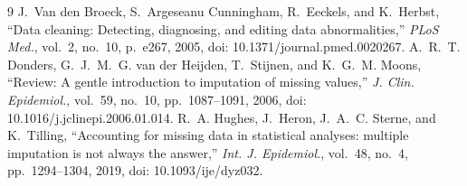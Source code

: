 \documentclass[12pt,a4paper]{article}
\begin{document}
\setcounter{section}{2}


\begin{thebibliography}{9}
   J.~Van den Broeck, S.~Argeseanu Cunningham, R.~Eeckels, and
    K.~Herbst, ``Data cleaning: Detecting, diagnosing, and editing data abnormalities,''
    \emph{PLoS Med.}, vol.~2, no.~10, p.~e267, 2005, doi: 10.1371/journal.pmed.0020267.
   A.~R.~T. Donders, G.~J.~M.~G. van der Heijden, T.~Stijnen, and
    K.~G.~M. Moons, ``Review: A gentle introduction to imputation of missing values,''
    \emph{J. Clin. Epidemiol.}, vol.~59, no.~10, pp.~1087--1091, 2006,
    doi: 10.1016/j.jclinepi.2006.01.014.
   R.~A. Hughes, J.~Heron, J.~A.~C. Sterne, and K.~Tilling,
    ``Accounting for missing data in statistical analyses: multiple imputation is not
    always the answer,'' \emph{Int. J. Epidemiol.}, vol.~48, no.~4, pp.~1294--1304, 2019,
    doi: 10.1093/ije/dyz032.
\end{thebibliography}
\end{document}
